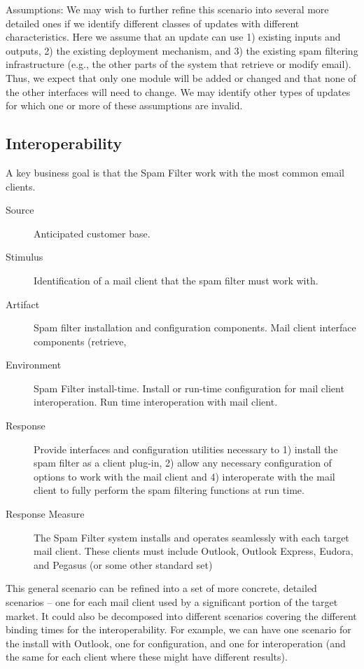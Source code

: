 \documentclass[letterpaper,11pt]{article}
\begin{document}
Assumptions: We may wish to further refine this scenario into several more
detailed ones if we identify different classes of updates with different
characteristics. Here we assume that an update can use 1) existing inputs and
outputs, 2) the existing deployment mechanism, and 3) the existing spam
filtering infrastructure (e.g., the other parts of the system that retrieve or
modify email). Thus, we expect that only one module will be added or changed
and that none of the other interfaces will need to change. We may identify
other types of updates for which one or more of these assumptions are invalid.

\subsection{Interoperability}
A key business goal is that the Spam Filter work with the most common email
clients.
\begin{description} 
\item[Source] Anticipated customer base.
\item[Stimulus] Identification of a mail client that the spam filter must work
  with.
\item[Artifact] Spam filter installation and configuration components. Mail
  client interface components (retrieve,
\item[Environment] Spam Filter install-time. Install or run-time configuration
  for mail client interoperation. Run time interoperation with mail client.
\item[Response] Provide interfaces and configuration utilities necessary to 1)
  install the spam filter as a client plug-in, 2) allow any necessary
  configuration of options to work with the mail client and 4) interoperate
  with the mail client to fully perform the spam filtering functions at run
  time.
\item[Response Measure] The Spam Filter system installs and operates
  seamlessly with each target mail client. These clients must include Outlook,
  Outlook Express, Eudora, and Pegasus (or some other standard set)
\end{description}
 
This general scenario can be refined into a set of more concrete, detailed
scenarios – one for each mail client used by a significant portion of the
target market. It could also be decomposed into different scenarios covering
the different binding times for the interoperability. For example, we can have
one scenario for the install with Outlook, one for configuration, and one for
interoperation (and the same for each client where these might have different
results).
 
\end{document}
